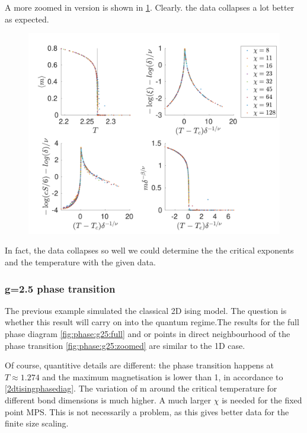 A more zoomed in version is shown in \cref{fig:phase:g0:zoomed}. Clearly. the data collapses a lot better as expected.
\begin{figure}
    \center
    \includegraphics[width=\textwidth]{Figuren/phasediag/g0/zoomed.pdf}
    \caption{  }
    \label{fig:phase:g0:zoomed}
\end{figure}
In fact, the data collapses so well we could determine the the critical exponents and the temperature with the given data.


\subsubsection{g=2.5 phase transition }

The previous example simulated the classical 2D ising model. The question is whether this result will carry on into the quantum regime.The results for the full phase diagram \cref{fig:phase:g25:full} and or points in direct neighbourhood of the phase transition \cref{fig:phase:g25:zoomed} are similar to the 1D case.

Of course, quantitive details are different: the phase transition happens at $T\approx 1.274$ and the maximum magnetisation is lower than 1, in accordance to \cref{2dtisingphasediag}. The variation of m around the critical temperature for different bond dimensions is much higher. A much larger $\chi$ is needed for the fixed point MPS. This is not necessarily a problem, as this gives better data for the finite size scaling.

